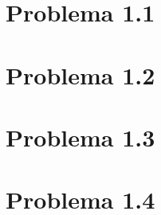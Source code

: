 \section{Problema 1.1}

\newpage

\section{Problema 1.2}

\newpage

\section{Problema 1.3}

\newpage

\section{Problema 1.4}\label{problema1_4}

